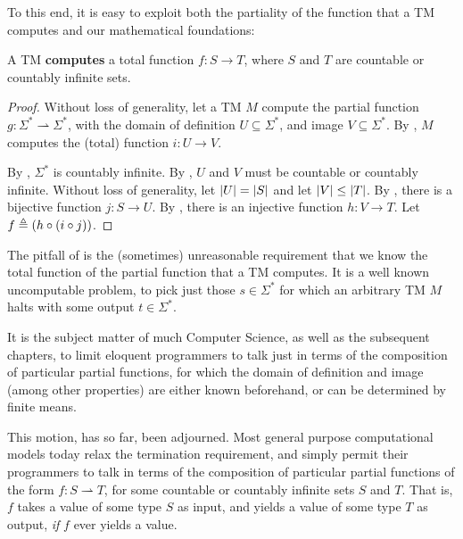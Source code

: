 To this end, it is easy to exploit both the partiality of the function that a
TM computes and our mathematical foundations:

\begin{theorem} \label{thm:tm-total} A TM \textbf{computes} a total
function $f : S \rightarrow T$, where $S$ and $T$ are countable or countably
infinite sets. \end{theorem}

\begin{proof} Without loss of generality, let a TM $M$ compute the partial
function $g : \Sigma^* \rightharpoonup \Sigma^*$, with the domain of definition
$U \subseteq \Sigma^*$, and image $V \subseteq \Sigma ^*$. By
, $M$ computes the (total) function $i : U
\rightarrow V$.

By , $\Sigma^*$ is countably infinite.
By , $U$ and $V$ must be countable or
countably infinite. Without loss of generality, let $\mathopen{}\left|{U}\right|\mathclose{}=\mathopen{}\left|{S}\right|\mathclose{}$ and let
$\mathopen{}\left|{V}\right|\mathclose{}\leq\mathopen{}\left|{T}\right|\mathclose{}$. By , there is a bijective function $j
: S \rightarrow U$. By , there is an injective function $h : V
\rightarrow T$. Let $f \triangleq \mathopen{}\left({h \circ \mathopen{}\left({i \circ j}\right)\mathclose{}}\right)\mathclose{}$.\end{proof}

The pitfall of  is the (sometimes) unreasonable requirement
that we know the total function of the partial function that a TM computes. It
is a well known uncomputable problem, to pick just those $s \in \Sigma^*$ for
which an arbitrary TM $M$ halts with some output $t \in \Sigma^*$.


It is the subject matter of much Computer Science, as well as the subsequent
chapters, to limit eloquent programmers to talk just in terms of the
composition of particular partial functions, for which the domain of definition
and image (among other properties) are either known beforehand, or can be
determined by finite means. 

This motion, has so far, been adjourned. Most general purpose computational
models today relax the termination requirement, and simply permit their
programmers to talk in terms of the composition of particular partial functions
of the form $f : S \rightharpoonup T$, for some countable or countably infinite
sets $S$ and $T$. That is, $f$ takes a value of some type $S$ as input, and
yields a value of some type $T$ as output, \emph{if} $f$ ever yields a value.


